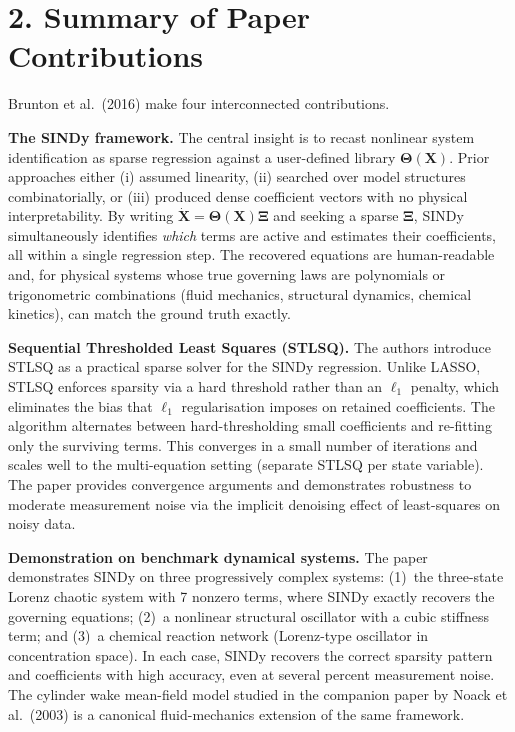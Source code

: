 \documentclass[12pt]{article}
\begin{document}
\section*{2. Summary of Paper Contributions}

Brunton et al.\ (2016) make four interconnected contributions.

\textbf{The SINDy framework.}
The central insight is to recast nonlinear system identification as sparse
regression against a user-defined library $\boldsymbol{\Theta}(\mathbf{X})$.
Prior approaches either (i) assumed linearity, (ii) searched over model
structures combinatorially, or (iii) produced dense coefficient vectors with
no physical interpretability.  By writing $\dot{\mathbf{X}} =
\boldsymbol{\Theta}(\mathbf{X})\boldsymbol{\Xi}$ and seeking a sparse
$\boldsymbol{\Xi}$, SINDy simultaneously identifies \emph{which} terms are
active and estimates their coefficients, all within a single regression
step.  The recovered equations are human-readable and, for physical systems
whose true governing laws are polynomials or trigonometric combinations
(fluid mechanics, structural dynamics, chemical kinetics), can match the
ground truth exactly.

\textbf{Sequential Thresholded Least Squares (STLSQ).}
The authors introduce STLSQ as a practical sparse solver for the SINDy
regression.  Unlike LASSO, STLSQ enforces sparsity via a hard threshold
rather than an $\ell_1$ penalty, which eliminates the bias that $\ell_1$
regularisation imposes on retained coefficients.  The algorithm alternates
between hard-thresholding small coefficients and re-fitting only the
surviving terms.  This converges in a small number of iterations and scales
well to the multi-equation setting (separate STLSQ per state variable).
The paper provides convergence arguments and demonstrates robustness to
moderate measurement noise via the implicit denoising effect of
least-squares on noisy data.

\textbf{Demonstration on benchmark dynamical systems.}
The paper demonstrates SINDy on three progressively complex systems:
(1)~the three-state Lorenz chaotic system with 7 nonzero terms, where
SINDy exactly recovers the governing equations; (2)~a nonlinear structural
oscillator with a cubic stiffness term; and (3)~a chemical reaction network
(Lorenz-type oscillator in concentration space).  In each case, SINDy
recovers the correct sparsity pattern and coefficients with high accuracy,
even at several percent measurement noise.  The cylinder wake mean-field
model studied in the companion paper by Noack et al.\ (2003) is a canonical
fluid-mechanics extension of the same framework.
\end{document}
